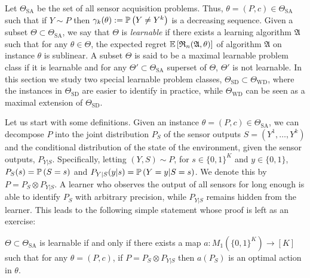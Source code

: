 \newcommand{\SA}{\mathrm{SA}}
\newcommand{\SD}{\mathrm{SD}}
\newcommand{\WD}{\mathrm{WD}}
\newcommand{\TSA}{\Theta_{\SA}}
\newcommand{\Alg}{\mathfrak{A}}
\newcommand{\TSD}{\Theta_{\SD}}
\newcommand{\TWD}{\Theta_{\WD}}
Let $\TSA$ be the set of all sensor acquisition problems. 
Thus, $\theta = (P,c)\in \TSA$ such that if $Y\sim P$ then $\gamma_k(\theta):=\mathbb{P}\left(Y\ne Y^k\right)$ 
is a decreasing sequence.
Given a subset $\Theta\subset \TSA$, we say that $\Theta$ is \emph{learnable} 
if there exists a learning algorithm $\Alg$ such that
for any $\theta\in \Theta$, the expected regret $\EE{ \Regret_n(\Alg,\theta) }$ 
of algorithm $\Alg$ on instance $\theta$ is sublinear.
A subset $\Theta$ is said to be a maximal learnable problem class if it is learnable and for any $\Theta'\subset \TSA$ superset
of $\Theta$, $\Theta'$ is not learnable.
In this section we study two special learnable problem classes, $\TSD\subset \TWD$, where the instances in $\TSD$ are easier to identify in practice, while $\TWD$ can be seen as a maximal extension of $\TSD$.

Let us start with some definitions.
Given an instance $\theta = (P,c)\in \TSA$, we can decompose $P$ into the joint distribution $P_S$ of the sensor outputs $S = (Y^1,\dots,Y^k)$ and the conditional distribution of the state of the environment, given the sensor outputs, $P_{Y|S}$.
Specifically, letting $(Y,S)\sim P$, for $s\in \{0,1\}^K$ and $y\in \{0,1\}$, $P_S(s) = \mathbb{P}\left(S = s\right)$ and $P_{Y|S}(y|s) = \mathbb{P}\left(Y=y|S=s\right)$. We denote this by $P = P_S \otimes P_{Y|S}$.
A learner who observes the output of all sensors for long enough is able to identify $P_S$ with arbitrary precision, while $P_{Y|S}$ remains hidden from the learner. This leads to the following simple statement whose proof is left as an exercise:
\begin{proposition}
\label{prop:learnablemap}
$\Theta\subset \TSA$ is learnable if and only if there exists a map $a: M_1( \{0,1\}^K ) \to [K]$ such that 
for any $\theta= (P,c)$, if $P = P_S \otimes P_{Y|S}$ then $a(P_S)$ is an optimal action in $\theta$.
\end{proposition}

